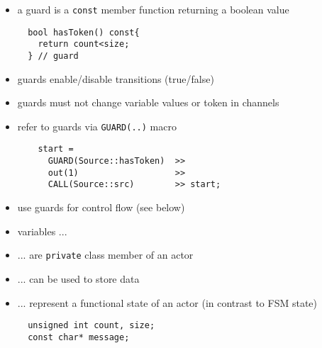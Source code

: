 \begin{frame}[fragile=singleslide]
\begin{itemize}
\item a guard is a \lstinline!const! member function returning a boolean value
\begin{lstlisting}
  bool hasToken() const{
    return count<size;
  } // guard
\end{lstlisting}
\item guards enable/disable transitions (true/false)
\item guards must not change variable values or token in channels
\item refer to guards via \lstinline!GUARD(..)! macro 
\begin{lstlisting}
    start = 
      GUARD(Source::hasToken)  >>
      out(1)                   >>
      CALL(Source::src)        >> start;
\end{lstlisting}
\item use guards for control flow (see below)
\end{itemize}
\end{frame}







\begin{frame}[fragile=singleslide]
\begin{itemize}
\item variables ...
\item ... are \lstinline!private! class member of an actor
\item ... can be used to store data
\item ... represent a functional state of an actor (in contrast to FSM state)
\begin{lstlisting}
  unsigned int count, size;
  const char* message;
\end{lstlisting}
\end{itemize}
\end{frame}






